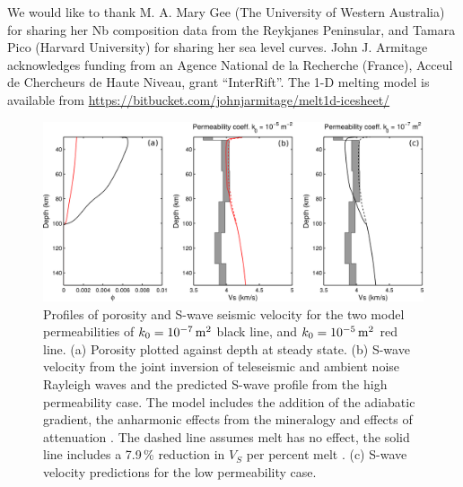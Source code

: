 \documentclass[draft,linenumbers]{agujournal2018}
\begin{document}
\acknowledgments
We would like to thank M. A. Mary Gee (The University of Western Australia) for sharing her Nb composition data from the Reykjanes Peninsular, and Tamara Pico (Harvard University) for sharing her sea level curves. John J. Armitage acknowledges funding from an Agence National de la Recherche (France), Acceul de Chercheurs de Haute Niveau, grant “InterRift”. The 1-D melting model is available from \url{https://bitbucket.com/johnjarmitage/melt1d-icesheet/}



\clearpage
\pagebreak
\newpage

\begin{figure}
\includegraphics{../figures/version05/supp-figure4.png}
\caption{Profiles of porosity and S-wave seismic velocity for the two model permeabilities of $k_{0} = 10^{-7}\rm\,m^{2}$ black line, and $k_{0} = 10^{-5}\rm\,m^{2}$ red line. (a) Porosity plotted against depth at steady state. (b) S-wave velocity from the joint inversion of teleseismic and ambient noise Rayleigh waves \citep{harmon-2016} and the predicted S-wave profile from the high permeability case. The model includes the addition of the adiabatic gradient, the anharmonic effects from the mineralogy and effects of attenuation \citep{goes-etal-2012}. The dashed line assumes melt has no effect, the solid line includes a 7.9\,\% reduction in $V_{S}$ per percent melt \citep{hammond-2000}. (c) S-wave velocity predictions for the low permeability case.}
\label{fg:2}
\end{figure}
\end{document}
